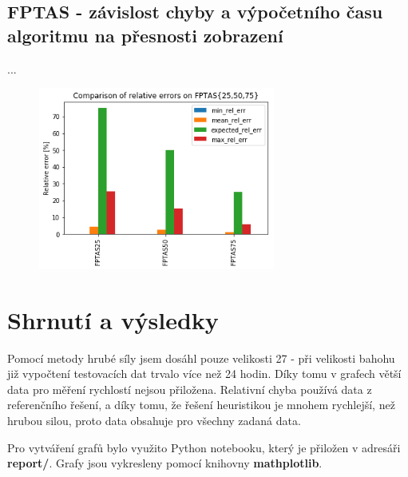 \documentclass[a4paper,10pt,twocolumn]{article}
\begin{document}
\subsection{FPTAS - závislost chyby a výpočetního času algoritmu na přesnosti zobrazení}

...


\begin{figure}[H]
  \begin{center}
    \includegraphics[height=6cm]{graphs/fptas_err_all.png}
  \end{center}
\end{figure}



\section{Shrnutí a výsledky}

Pomocí metody hrubé síly jsem dosáhl pouze velikosti 27 - při velikosti bahohu již vypočtení testovacích dat trvalo více než 24 hodin. Díky tomu v grafech větší data pro měření rychlostí nejsou přiložena. 
Relativní chyba používá data z referenčního řešení, a díky tomu, že řešení heuristikou je mnohem rychlejší, než hrubou silou, proto data obsahuje pro všechny zadaná data.

Pro vytváření grafů bylo využito Python notebooku, který je přiložen v adresáři \textbf{report/}. Grafy jsou vykresleny pomocí knihovny \textbf{mathplotlib}.


\end{document}
